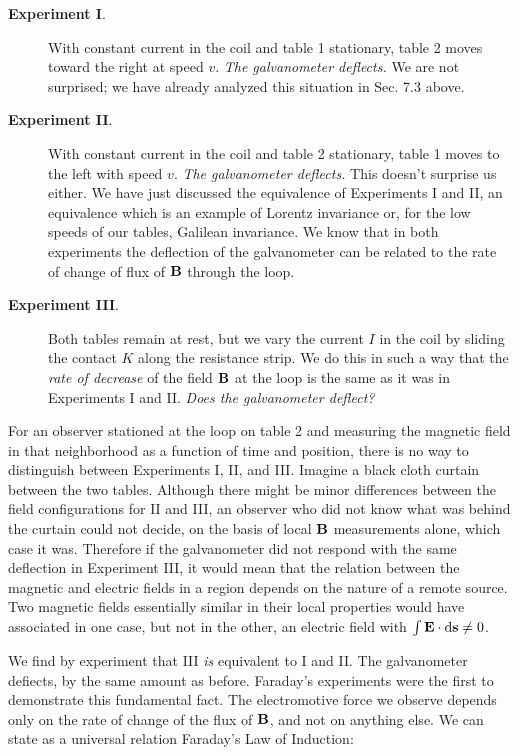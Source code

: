 \begin{description}

\item[\textbf{Experiment I}.] With constant current in the coil and table 1 
stationary, table 2 moves toward the right at speed $v$. \emph{The galvanometer
deflects.} We are not surprised; we have already analyzed this situation
in Sec. 7.3 above.

\item[\textbf{Experiment II}.] With constant current in the coil and table 2 
stationary, table 1 moves to the left with speed $v$. \emph{The galvanometer
deflects.} This doesn't surprise us either. We have just discussed the
equivalence of Experiments I and II, an equivalence which is an example
of Lorentz invariance or, for the low speeds of our tables,
Galilean invariance. We know that in both experiments the deflection
of the galvanometer can be related to the rate of change of flux
of $\mathbf{B}$ through the loop.

\item[\textbf{Experiment III}.] Both tables remain at rest, but we vary the current
$I$ in the coil by sliding the contact $K$ along the resistance strip. We
do this in such a way that the \emph{rate of decrease} of the field $\mathbf{B}$ at the loop
is the same as it was in Experiments I and II. \emph{Does the galvanometer
deflect?}

\end{description}


For an observer stationed at the loop on table 2 and measuring
the magnetic field in that neighborhood as a function of time and
position, there is no way to distinguish between Experiments I, II,
and III. Imagine a black cloth curtain between the two tables.
Although there might be minor differences between the field configurations
for II and III, an observer who did not know what was
behind the curtain could not decide, on the basis of local $\mathbf{B}$ measurements
alone, which case it was. Therefore if the galvanometer did
not respond with the same deflection in Experiment III, it would
mean that the relation between the magnetic and electric fields in a
region depends on the nature of a remote source. Two magnetic
fields essentially similar in their local properties would have associated
in one case, but not in the other, an electric field with
$\int\mathbf{E}\cdot\textup{d}\mathbf{s}\ne0$.

We find by experiment that III \emph{is} equivalent to I and II. The
galvanometer defiects, by the same amount as before. Faraday's
experiments were the first to demonstrate this fundamental fact.
The electromotive force we observe depends only on the rate of
change of the flux of $\mathbf{B}$, and not on anything else. We can state as a
universal relation Faraday's Law of Induction:

